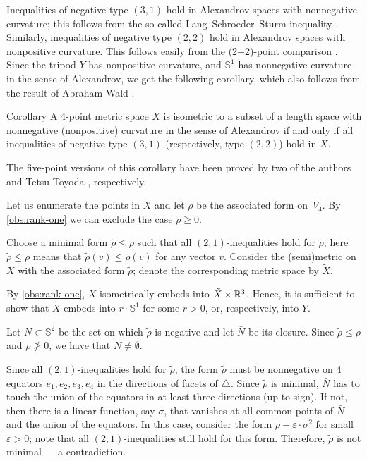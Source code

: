 Inequalities of negative type $(3, 1)$ hold in Alexandrov spaces with nonnegative curvature; this follows from the so-called Lang--Schroeder--Sturm inequality \cite{lang-schroeder, sturm}.
Similarly, inequalities of negative type $(2, 2)$ hold in Alexandrov spaces with nonpositive curvature.
This follows easily from the (2+2)-point comparison \cite[9.5]{AKP-2024}.
Since the tripod $Y$ has nonpositive curvature, and $\mathbb{S}^1$ has nonnegative curvature in the sense of Alexandrov, we get the following corollary, which also follows from the result of Abraham Wald \cite[§ 7]{wald}.

\begin{thm}{Corollary}\label{cor:Four-point arrays}
A 4-point metric space $X$ is isometric to a subset of a length space with nonnegative (nonpositive) curvature in the sense of Alexandrov if and only if all inequalities of negative type $(3, 1)$ (respectively, type $(2, 2)$) hold in $X$.
\end{thm}

The five-point versions of this corollary have been proved by two of the authors \cite{lebedeva-petrunin-2024} and Tetsu Toyoda \cite{toyoda,lebedeva-petrunin2021}, respectively.

Let us enumerate the points in $X$ and let $\rho$ be the associated form on~$V_4$.
By \ref{obs:rank-one} we can exclude the case $\rho\geqslant 0$.

Choose a minimal form $\tilde\rho\leqslant \rho$ such that all $(2,1)$-inequalities hold for $\tilde\rho$;
here $\tilde\rho\leqslant \rho$ means that $\tilde\rho(v)\leqslant \rho(v)$ for any vector $v$.
Consider the (semi)metric on $X$ with the associated form $\tilde\rho$;
denote the corresponding metric space by $\tilde X$.

By \ref{obs:rank-one}, $X$ isometrically embeds into $\tilde X\times \mathbb{R}^3$.
Hence, it is sufficient to show that $\tilde X$ embeds into $r\cdot \mathbb{S}^1$ for some $r>0$, or, respectively, into $Y$.

Let $N\subset \mathbb{S}^2$ be the set on which $\tilde\rho$ is negative and let $\bar N$ be its closure.
Since $\tilde\rho\leqslant \rho$ and $\rho\ngeqslant0$, we have that $N\ne \emptyset$.

Since all $(2,1)$-inequalities hold for $\tilde\rho$, the form $\tilde\rho$
must be nonnegative on 4 equators $e_1,e_2,e_3,e_4$ in the directions of facets of $\triangle$.
Since $\tilde\rho$ is minimal, $\bar N$ has to touch the union of the equators in at least three directions (up to sign).
If not, then there is a linear function, say $\sigma$, that vanishes at all common points of $\bar N$ and the union of the equators.
In this case, consider the form $\tilde\rho-\varepsilon\cdot \sigma^2$ for small $\varepsilon>0$;
note that all $(2,1)$-inequalities still hold for this form.
Therefore, $\tilde\rho$ is not minimal --- a contradiction.

